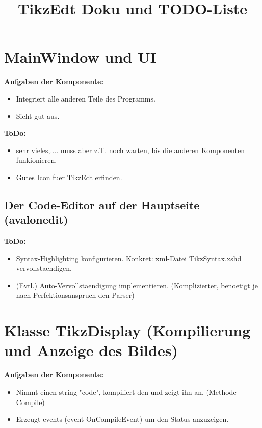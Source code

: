 \documentclass{article}
\begin{document}
\title{TikzEdt Doku und TODO-Liste}
\date{}
\maketitle


   \section{MainWindow und UI}

      {\bf Aufgaben der Komponente:}
\begin{itemize}
    \item Integriert alle anderen Teile des Programms.
      \item  Sieht gut aus.
\end{itemize}

      {\bf  ToDo:}
\begin{itemize}
       \item  sehr vieles,.... muss aber z.T. noch warten, bis die anderen Komponenten funkionieren.
        \item  Gutes Icon fuer TikzEdt erfinden.
\end{itemize}

\subsection{Der Code-Editor auf der Hauptseite  (avalonedit) }
      {\bf ToDo:}
\begin{itemize}
        \item  Syntax-Highlighting konfigurieren.
            Konkret: xml-Datei TikzSyntax.xshd vervollstaendigen.
       \item (Evtl.) Auto-Vervollstaendigung implementieren. (Komplizierter, benoetigt je nach Perfektionsanspruch den Parser)
\end{itemize}


   \section{Klasse TikzDisplay (Kompilierung und Anzeige des Bildes)}

     {\bf Aufgaben der Komponente:}
\begin{itemize}
    \item Nimmt einen string "code", kompiliert den und zeigt ihn an. (Methode Compile)
  \item Erzeugt events (event OnCompileEvent) um den Status anzuzeigen.
\end{itemize}
\end{document}
